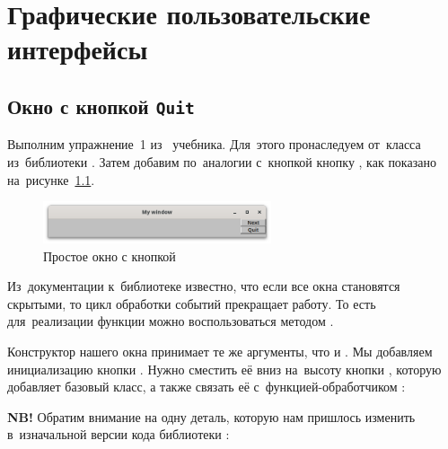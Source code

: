 
\chapter{Графические пользовательские интерфейсы}

\section{Окно с кнопкой \texttt{Quit}}
Выполним упражнение~1 из~ учебника. Для~этого пронаследуем  от~класса  из~библиотеки . Затем добавим по~аналогии с~кнопкой  кнопку , как показано на~рисунке~\ref{fig:mywindow}.

\begin{figure}[ht]
    {\centering
        \includegraphics[width=0.6\textwidth]{images/my_window.png}

    }
    \caption{Простое окно  с кнопкой }
    \label{fig:mywindow}
\end{figure}

Из~документации к~библиотеке  известно, что если все окна становятся скрытыми, то цикл обработки событий прекращает работу. То есть для~реализации функции  можно воспользоваться методом .


Конструктор нашего окна принимает те же аргументы, что и . Мы добавляем инициализацию кнопки . Нужно сместить её вниз на~высоту кнопки , которую добавляет базовый класс, а также связать её с~функцией-обработчиком :


\textbf{NB!} Обратим внимание на одну деталь, которую нам пришлось изменить в~изначальной версии кода библиотеки :

